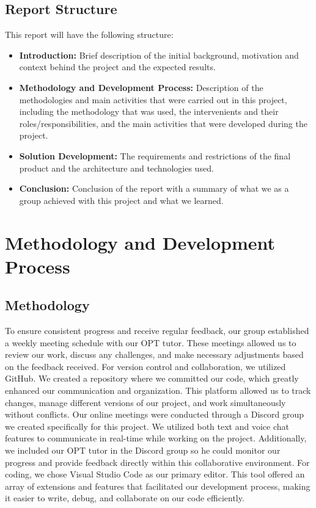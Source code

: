 \documentclass[10pt]{article}
\begin{document}
    \subsection{Report Structure}
        This report will have the following structure:
        \begin{itemize}
            \item     \textbf{Introduction:} Brief description of the initial background, motivation and context behind the project and the expected results.
            \item     \textbf{Methodology and Development Process:} Description of the methodologies and main activities that were carried out in this project, including the methodology that was used, the intervenients and their roles/responsibilities, and the main activities that were developed during the project.
            \item     \textbf{Solution Development:} The requirements and restrictions of the final product and the architecture and technologies used.
            \item     \textbf{Conclusion:} Conclusion of the report with a summary of what we as a group achieved with this project and what we learned.
        \end{itemize}

\section{Methodology and Development Process}

    \subsection{Methodology}
        To ensure consistent progress and receive regular feedback, our group established a weekly meeting schedule with our OPT tutor. These meetings allowed us to review our work, discuss any challenges, and make necessary adjustments based on the feedback received.
        For version control and collaboration, we utilized GitHub. We created a repository where we committed our code, which greatly enhanced our communication and organization. This platform allowed us to track changes, manage different versions of our project, and work simultaneously without conflicts.
        Our online meetings were conducted through a Discord group we created specifically for this project. We utilized both text and voice chat features to communicate in real-time while working on the project. Additionally, we included our OPT tutor in the Discord group so he could monitor our progress and provide feedback directly within this collaborative environment.
        For coding, we chose Visual Studio Code as our primary editor. This tool offered an array of extensions and features that facilitated our development process, making it easier to write, debug, and collaborate on our code efficiently.
\end{document}
